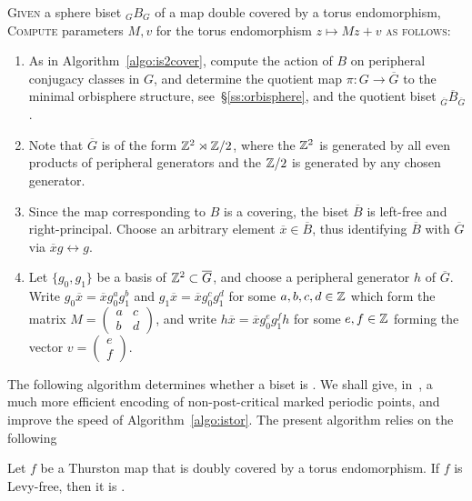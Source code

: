 \documentclass{amsart}
\begin{document}
\begin{algo}\label{algo:getparam}
  \textsc{Given} a sphere biset ${}_G B_G$ of a map double covered by
  a torus endomorphism,\\
  \textsc{Compute} parameters $M,v$ for the torus endomorphism
  $z\mapsto M z+v$ \textsc{as follows:}\\\upshape
  \begin{enumerate}
  \item As in Algorithm~\ref{algo:is2cover}, compute the action of $B$
    on peripheral conjugacy classes in $G$, and determine the quotient
    map $\pi\colon G\to\overline G$ to the minimal orbisphere
    structure, see~\S\ref{ss:orbisphere}, and the quotient biset
    ${}_{\overline G}\overline B_{\overline G}$.
  \item Note that $\overline G$ is of the form ${\mathbb Z}^2\rtimes{\mathbb Z}/2$,
    where the ${\mathbb Z}^2$ is generated by all even products of peripheral
    generators and the ${\mathbb Z}/2$ is generated by any chosen generator.
  \item Since the map corresponding to $B$ is a covering, the biset
    $\overline B$ is left-free and right-principal. Choose an
    arbitrary element $\overline x\in\overline B$, thus identifying
    $\overline B$ with $\overline G$ via
    $\overline x g\leftrightarrow g$.
  \item Let $\{g_0,g_1\}$ be a basis of ${\mathbb Z}^2\subset\overline G$, and
    choose a peripheral generator $h$ of $\overline G$. Write
    $g_0\overline x=\overline x g_0^a g_1^b$ and
    $g_1\overline x=\overline x g_0^c g_1^d$ for some $a,b,c,d\in{\mathbb Z}$
    which form the matrix
    $M=(\begin{smallmatrix}a&c\\ b&d\end{smallmatrix})$, and write
    $h\overline x=\overline x g_0^e g_1^f h$ for some $e,f\in{\mathbb Z}$
    forming the vector $v=(\begin{smallmatrix}e\\ f\end{smallmatrix})$.
  \end{enumerate}
\end{algo}

The following algorithm determines whether a biset is \Tor.  We shall
give, in~\cite{bartholdi-dudko:bc3}, a much more efficient encoding of
non-post-critical marked periodic points, and improve the speed of
Algorithm~\ref{algo:istor}. The present algorithm relies on the following
\begin{thm}\label{thm:nikita}
  Let $f$ be a Thurston map that is doubly covered by a torus endomorphism. If $f$ is Levy-free, then it is \Tor.
\end{thm}
\end{document}
